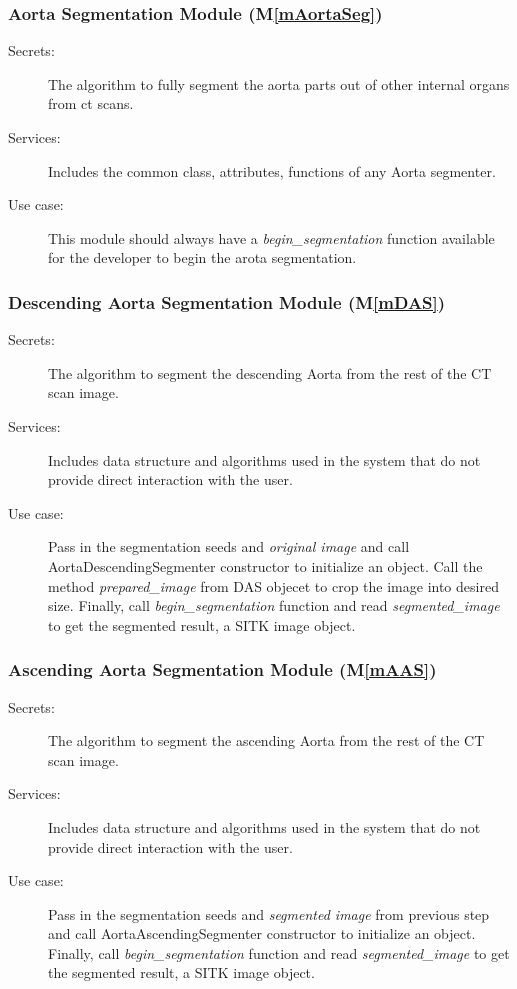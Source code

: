 \documentclass[12pt, titlepage]{article}
\newcommand{\mref}[1]{M\ref{#1}}
\begin{document}
\subsubsection{Aorta Segmentation Module (\mref{mAortaSeg})}
\begin{description}
\item[Secrets:] The algorithm to fully segment the aorta parts out of other internal organs from ct scans.
\item[Services:] Includes the common class, attributes, functions of any Aorta segmenter.
\item[Use case:] This module should always have a \emph{begin\_segmentation} function available for the developer to begin the arota segmentation.
\end{description}

\subsubsection{Descending Aorta Segmentation Module (\mref{mDAS})}
\begin{description}
\item[Secrets:] The algorithm to segment the descending Aorta from the rest of the CT scan image.
\item[Services:] Includes data structure and algorithms used in the system that
  do not provide direct interaction with the user. 
\item[Use case:] Pass in the segmentation seeds and \emph{original image} and call AortaDescendingSegmenter constructor to initialize an object.
Call the method \emph{prepared\_image} from DAS objecet to crop the image into desired size.
Finally, call \emph{begin\_segmentation} function and read \emph{segmented\_image}
to get the segmented result, a SITK image object.
\end{description}

\subsubsection{Ascending Aorta Segmentation Module (\mref{mAAS})}
\begin{description}
\item[Secrets:] The algorithm to segment the ascending Aorta from the rest of the CT scan image.
\item[Services:] Includes data structure and algorithms used in the system that
  do not provide direct interaction with the user. 
\item[Use case:] Pass in the segmentation seeds and \emph{segmented image} from previous step and call AortaAscendingSegmenter constructor to initialize an object.
Finally, call \emph{begin\_segmentation} function and read \emph{segmented\_image}
to get the segmented result, a SITK image object.
\end{description}
\end{document}
